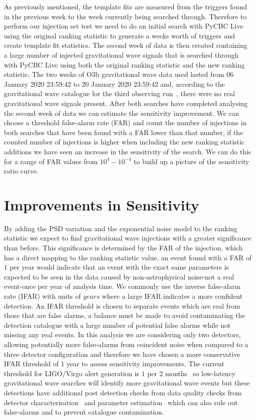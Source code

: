 As previously mentioned, the template fits are measured from the triggers found in the previous week to the week currently being searched through. Therefore to perform our injection set test we need to do an initial search with PyCBC Live using the original ranking statistic to generate a weeks worth of triggers and create template fit statistics. The second week of data is then created containing a large number of injected gravitational wave signals that is searched through with PyCBC Live using both the original ranking statistic and the new ranking statistic. The two weeks of O3b gravitational wave data used lasted from 06 January 2020 23:59:42 to 20 January 2020 23:59:42 and, according to the gravitational wave catalogue for the third observing run~\cite{gwtc3:2023}, there were no real gravitational wave signals present. After both searches have completed analysing the second week of data we can estimate the sensitivity improvement. We can choose a threshold false-alarm rate (FAR) and count the number of injections in both searches that have been found with a FAR lower than that number, if the counted number of injections is higher when including the new ranking statistic additions we have seen an increase in the sensitivity of the search. We can do this for a range of FAR values from $10^{4} - 10^{-4}$ to build up a picture of the sensitivity ratio curve.

\section{\label{5:sec:sensitivity-improvements}Improvements in Sensitivity}

By adding the PSD variation and the exponential noise model to the ranking statistic we expect to find gravitational wave injections with a greater significance than before. This significance is determined by the FAR of the injection, which has a direct mapping to the ranking statistic value, an event found with a FAR of $1$ per year would indicate that an event with the exact same parameters is expected to be seen in the data caused by non-astrophysical noise-not a real event-once per year of analysis time. We commonly use the inverse false-alarm rate (IFAR) with units of $years$ where a large IFAR indicates a more confident detection. An IFAR threshold is chosen to separate events which are real from those that are false alarms, a balance must be made to avoid contaminating the detection catalogue with a large number of potential false alarms while not missing any real events. In this analysis we are considering only two detectors, allowing potentially more false-alarms from coincident noise when compared to a three detector configuration and therefore we have chosen a more conservative IFAR threshold of $1$ year to assess sensitivity improvements. The current threshold for LIGO/Virgo alert generation is $1$ per $2$ months~\cite{PyCBC_Live:2018} so low-latency gravitational wave searches will identify more gravitational wave events but these detections have additional post detection checks from data quality checks from detector characterisation~\cite{O2O3_DetChar:2021} and parameter estimation~\cite{gwtc3:2023} which can also rule out false-alarms and to prevent catalogue contamination.


